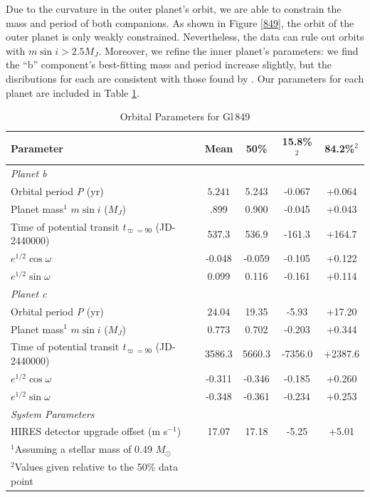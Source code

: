 Due to the curvature in the outer planet's orbit, we are able to constrain the mass and period of both companions. As shown in Figure \ref{849}, the orbit of the outer planet is only weakly constrained. Nevertheless, the data can rule out orbits with $m \sin i > 2.5 M_J$. Moreover, we refine the inner planet's parameters: we find the ``b'' component's best-fitting mass and period increase slightly, but the disributions for each are consistent with those found by \citet{Butler06}. Our parameters for each planet are included in Table \ref{T849}.

\begin{table}[hbt!]
\footnotesize
\centering
\begin{tabular}{lcccc}
\hline
Parameter & Mean & 50\% & 15.8\%$^2$ & 84.2\%$^2$ \\
    \hline
     \textit{Planet b} &   \\
  Orbital period \textit{P} (yr) & $5.241$ & 5.243 & -0.067 & +0.064  \\ 
  Planet mass$^{1}$ \textit{$m \sin i$} ($M_J$) & .899 & 0.900 & -0.045 & +0.043 \\
  Time of potential transit \textit{t$_{\varpi=90}$} (JD-2440000) & 537.3 & 536.9 & -161.3 & +164.7 \\
  $e^{1/2} \cos{\omega}$ & -0.048 & -0.059 & -0.105 & +0.122 \\
  $e^{1/2} \sin{\omega}$ & 0.099 & 0.116 & -0.161 & +0.114 \\
     \textit{Planet c} & \\
  Orbital period \textit{P} (yr) & $24.04$ & 19.35 & -5.93 & +17.20  \\ 
  Planet mass$^{1}$ \textit{$m \sin i$} ($M_J$) & 0.773 & 0.702 & -0.203 & +0.344 \\
  Time of potential transit \textit{t$_{\varpi=90}$} (JD-2440000) & 3586.3 & 5660.3 & -7356.0 & +2387.6\\
  $e^{1/2} \cos{\omega}$ & -0.311 & -0.346 & -0.185 & +0.260 \\
  $e^{1/2} \sin{\omega}$ & -0.348 & -0.361 & -0.234 & +0.253 \\
     \textit{System Parameters} & \\
  HIRES detector upgrade offset (m s$^{-1}$) & 17.07 & 17.18 & -5.25 & +5.01 \\
\hline
 $^1$Assuming a stellar mass of 0.49 $M_{\odot}$ \\
 $^2$Values given relative to the 50\% data point 
\end{tabular}
\caption{Orbital Parameters for Gl\,849}

\label{T849}
\end{table}

